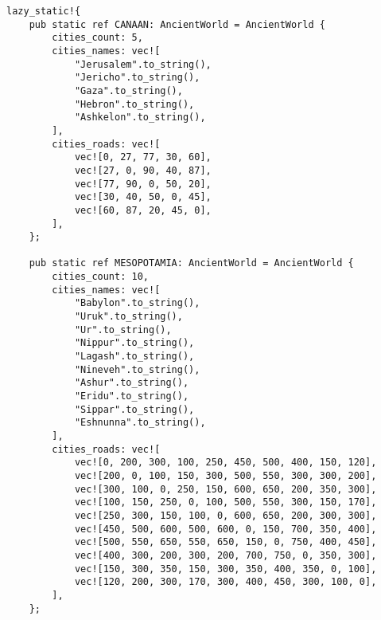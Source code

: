 \begin{center}
\captionsetup{justification=raggedright,singlelinecheck=off}
\begin{lstlisting}[label=lst:ancient_world_example,caption=примеры стран древнего мира]
lazy_static!{
    pub static ref CANAAN: AncientWorld = AncientWorld {
        cities_count: 5,
        cities_names: vec![
            "Jerusalem".to_string(),
            "Jericho".to_string(),
            "Gaza".to_string(),
            "Hebron".to_string(),
            "Ashkelon".to_string(),
        ],
        cities_roads: vec![
            vec![0, 27, 77, 30, 60],
            vec![27, 0, 90, 40, 87],
            vec![77, 90, 0, 50, 20],
            vec![30, 40, 50, 0, 45],
            vec![60, 87, 20, 45, 0],
        ],
    };
    
    pub static ref MESOPOTAMIA: AncientWorld = AncientWorld {
        cities_count: 10,
        cities_names: vec![
            "Babylon".to_string(),
            "Uruk".to_string(),
            "Ur".to_string(),
            "Nippur".to_string(),
            "Lagash".to_string(),
            "Nineveh".to_string(),
            "Ashur".to_string(),
            "Eridu".to_string(),
            "Sippar".to_string(),
            "Eshnunna".to_string(),
        ],
        cities_roads: vec![
            vec![0, 200, 300, 100, 250, 450, 500, 400, 150, 120], 
            vec![200, 0, 100, 150, 300, 500, 550, 300, 300, 200], 
            vec![300, 100, 0, 250, 150, 600, 650, 200, 350, 300], 
            vec![100, 150, 250, 0, 100, 500, 550, 300, 150, 170], 
            vec![250, 300, 150, 100, 0, 600, 650, 200, 300, 300], 
            vec![450, 500, 600, 500, 600, 0, 150, 700, 350, 400], 
            vec![500, 550, 650, 550, 650, 150, 0, 750, 400, 450], 
            vec![400, 300, 200, 300, 200, 700, 750, 0, 350, 300], 
            vec![150, 300, 350, 150, 300, 350, 400, 350, 0, 100], 
            vec![120, 200, 300, 170, 300, 400, 450, 300, 100, 0], 
        ],
    };


\end{lstlisting}
\end{center}
